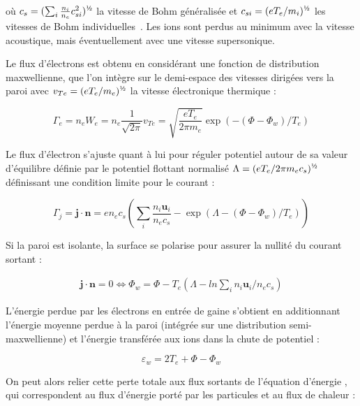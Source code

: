 \begin{refsection}
où $c_s=(\sum_i\frac{n_i}{n_e}c_{si}^2)^{\text{\textonehalf}}$ la vitesse de Bohm
généralisée et
$c_{si}=(eT_e/m_i)^{\text{\textonehalf}}$ les vitesses de Bohm
individuelles~\parencite{Riemann95,Severn}.
Les ions sont perdus au minimum avec la vitesse acoustique, mais
éventuellement avec une vitesse supersonique.

Le flux d'électrons est obtenu en considérant une fonction de distribution
maxwellienne, que l'on intègre sur le demi-espace des vitesses dirigées vers la
paroi avec $v_{Te}=(eT_e/m_e)^{\text{\textonehalf}}$ la vitesse électronique
thermique :

\begin{equation}
\Gamma_e=n_eW_e=n_e\frac{1}{\sqrt{2\pi}}v_{Te}=\sqrt{\frac{eT_e}{2\pi
m_e}}\exp(-(\Phi-\Phi_w)/T_e)
\end{equation}

Le flux d'électron s'ajuste
quant à lui pour réguler potentiel autour de sa valeur
d'équilibre définie par le potentiel flottant normalisé $\Lambda=({eT_e}/{2\pi
m_e c_s})^{\text{\textonehalf}}$
définissant une condition limite pour le courant :

\begin{equation}
\Gamma_j=\mathbf{j}\cdot\mathbf{n}=en_ec_s\left(\sum_i\frac{n_i\mathbf
u_i}{n_ec_s}-\exp\left(\Lambda-(\Phi-\Phi_w)/T_e\right)\right)
\end{equation}

Si la paroi est isolante, la surface se polarise pour assurer la nullité du
courant sortant :

\begin{equation}\begin{split}
\mathbf j\cdot\mathbf{n}=0\Leftrightarrow
\Phi_w=\Phi-T_e(\Lambda-ln\sum_in_i\mathbf u_i/n_ec_s)
\end{split}\end{equation}

L'énergie perdue par les électrons en entrée de gaine s'obtient en
additionnant l'énergie moyenne perdue à la paroi (intégrée sur une distribution
semi-maxwellienne) et l'énergie transférée aux ions dans la chute de potentiel :

\begin{equation}
	\varepsilon_w=2T_e+\Phi-\Phi_w
\end{equation}
 
 On peut alors relier cette perte totale aux flux sortants de l'équation
 d'énergie , qui correspondent au flux d'énergie porté
 par les particules et au flux de chaleur :
 

\end{refsection}
